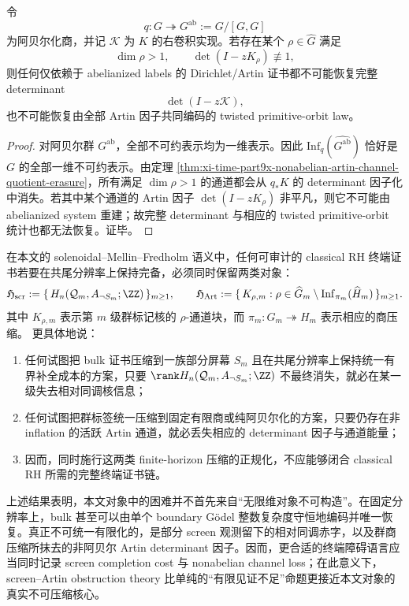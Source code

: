\begin{corollary}[阿贝尔化证书的严格不足性]\label{cor:xi-time-part9x-abelianized-certificate-strict-insufficiency}
令
\[
q:G\twoheadrightarrow G^{\mathrm{ab}}:=G/[G,G]
\]
为阿贝尔化商，并记 \(\mathcal K\) 为 \(K\) 的右卷积实现。若存在某个 \(\rho\in\widehat G\) 满足
\[
\dim\rho>1,
\qquad
\det(I-zK_\rho)\not\equiv 1,
\]
则任何仅依赖于 abelianized labels 的 Dirichlet/Artin 证书都不可能恢复完整 determinant
\[
\det(I-z\mathcal K),
\]
也不可能恢复由全部 Artin 因子共同编码的 twisted primitive-orbit law。
\end{corollary}
\begin{proof}
对阿贝尔群 \(G^{\mathrm{ab}}\)，全部不可约表示均为一维表示。因此 \(\mathrm{Inf}_q(\widehat{G^{\mathrm{ab}}})\) 恰好是 \(G\) 的全部一维不可约表示。由定理 \ref{thm:xi-time-part9x-nonabelian-artin-channel-quotient-erasure}，所有满足 \(\dim\rho>1\) 的通道都会从 \(q_*K\) 的 determinant 因子化中消失。若其中某个通道的 Artin 因子 \(\det(I-zK_\rho)\) 非平凡，则它不可能由 abelianized system 重建；故完整 determinant 与相应的 twisted primitive-orbit 统计也都无法恢复。证毕。
\end{proof}

\begin{conjecture}\label{conj:xi-time-part9x-rh-screen-artin-double-obstruction}
在本文的 solenoidal--Mellin--Fredholm 语义中，任何可审计的 classical RH 终端证书若要在共尾分辨率上保持完备，必须同时保留两类对象：
\[
\mathfrak H_{\mathrm{scr}}
:=
\{\,H_n(\mathcal Q_m,A_{\neg S_m};\ZZ)\,\}_{m\ge 1},
\qquad
\mathfrak H_{\mathrm{Art}}
:=
\{\,K_{\rho,m}:\rho\in\widehat G_m\setminus\mathrm{Inf}_{\pi_m}(\widehat H_m)\,\}_{m\ge 1}.
\]
其中 \(K_{\rho,m}\) 表示第 \(m\) 级群标记核的 \(\rho\)-通道块，而 \(\pi_m:G_m\twoheadrightarrow H_m\) 表示相应的商压缩。
更具体地说：
\begin{enumerate}
  \item 任何试图把 bulk 证书压缩到一族部分屏幕 \(S_m\) 且在共尾分辨率上保持统一有界补全成本的方案，只要 \(\rank H_n(\mathcal Q_m,A_{\neg S_m};\ZZ)\) 不最终消失，就必在某一级失去相对同调核信息；
  \item 任何试图把群标签统一压缩到固定有限商或纯阿贝尔化的方案，只要仍存在非 inflation 的活跃 Artin 通道，就必丢失相应的 determinant 因子与通道能量；
  \item 因而，同时施行这两类 finite-horizon 压缩的正规化，不应能够闭合 classical RH 所需的完整终端证书链。
\end{enumerate}
\end{conjecture}

\noindent
上述结果表明，本文对象中的困难并不首先来自“无限维对象不可构造”。在固定分辨率上，bulk 甚至可以由单个 boundary Gödel 整数复杂度守恒地编码并唯一恢复。真正不可统一有限化的，是部分 screen 观测留下的相对同调赤字，以及群商压缩所抹去的非阿贝尔 Artin determinant 因子。因而，更合适的终端障碍语言应当同时记录 screen completion cost 与 nonabelian channel loss；在此意义下，screen--Artin obstruction theory 比单纯的“有限见证不足”命题更接近本文对象的真实不可压缩核心。

\endinput

